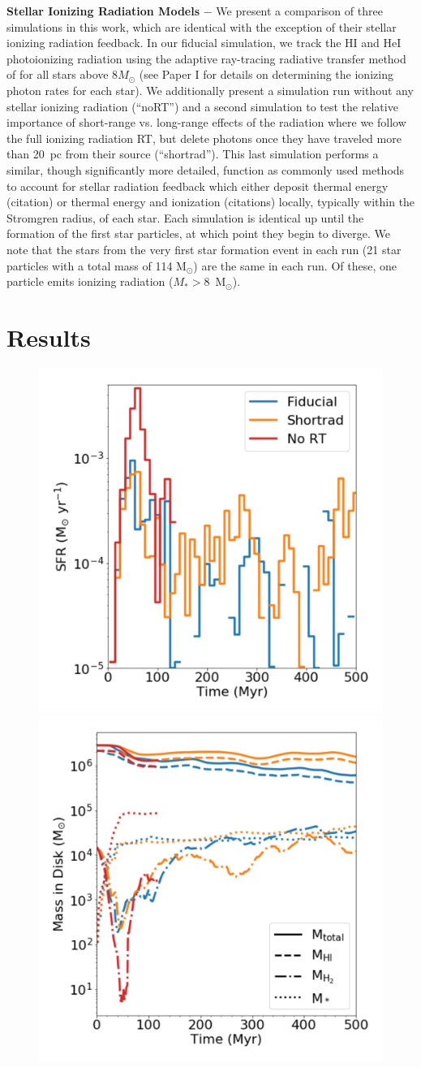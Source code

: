 \documentclass[twocolumn]{aastex62}
\begin{document}
\textbf{Stellar Ionizing Radiation Models} $-$ We present a comparison of three simulations in this work, which are identical with the exception of their stellar ionizing radiation feedback. In our fiducial simulation, we track the HI and HeI photoionizing radiation using the adaptive ray-tracing radiative transfer method of \citep{MORAY} for all stars above 8$M_{\odot}$ (see Paper I for details on determining the ionizing photon rates for each star). We additionally present a simulation run without any stellar ionizing radiation (``noRT'') and a second simulation to test the relative importance of short-range vs. long-range effects of the radiation where we follow the full ionizing radiation RT, but delete photons once they have traveled more than 20~pc from their source (``shortrad''). This last simulation performs a similar, though significantly more detailed, function as commonly used methods to account for stellar radiation feedback which either deposit thermal energy (citation) or thermal energy and ionization (citations) locally, typically within the Stromgren radius, of each star.  Each simulation is identical up until the formation of the first star particles, at which point they begin to diverge. We note that the stars from the very first star formation event in each run (21 star particles with a total mass of 114 M$_{\odot}$) are the same in each run. Of these, one particle emits ionizing radiation ($M_* > 8 $~M$_{\odot}$). 

\section{Results} \label{sec:results}

\begin{figure}
\centering
\includegraphics[width=0.49\linewidth]{sfr}
\includegraphics[width=0.49\linewidth]{mass}
\caption{}
\label{fig:sfr_mass_evolution}
\end{figure}
\end{document}

